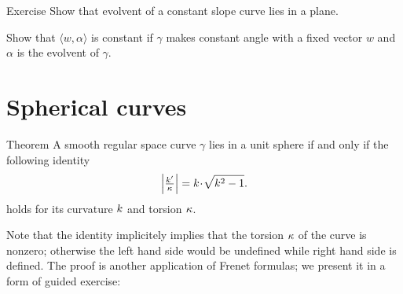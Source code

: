 \begin{thm}{Exercise} 
Show that evolvent of a constant slope curve lies in a plane.
\end{thm}

Show that $\langle w,\alpha\rangle$ is constant if $\gamma$ makes constant angle with a fixed vector $w$ and $\alpha$ is the evolvent of $\gamma$.

\section*{Spherical curves}

\begin{thm}{Theorem}
A smooth regular space curve $\gamma$ lies in a unit sphere if and only if 
the following identity 
\[\left|\tfrac{\kur'}{\tor}\right|=\kur\cdot\sqrt{\kur^2-1}.\]
holds for its curvature $k$ and torsion $\kappa$.
\end{thm}

Note that the identity implicitely implies that the torsion $\kappa$ of the curve is nonzero;
otherwise the left hand side would be undefined while right hand side is defined.
The proof is another application of Frenet formulas;
we present it in a form of guided exercise:

